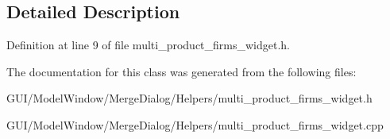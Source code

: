 \subsection{Detailed Description}


Definition at line 9 of file multi\+\_\+product\+\_\+firms\+\_\+widget.\+h.



The documentation for this class was generated from the following files\+:\begin{DoxyCompactItemize}
\item 
G\+U\+I/\+Model\+Window/\+Merge\+Dialog/\+Helpers/multi\+\_\+product\+\_\+firms\+\_\+widget.\+h\item 
G\+U\+I/\+Model\+Window/\+Merge\+Dialog/\+Helpers/multi\+\_\+product\+\_\+firms\+\_\+widget.\+cpp\end{DoxyCompactItemize}
